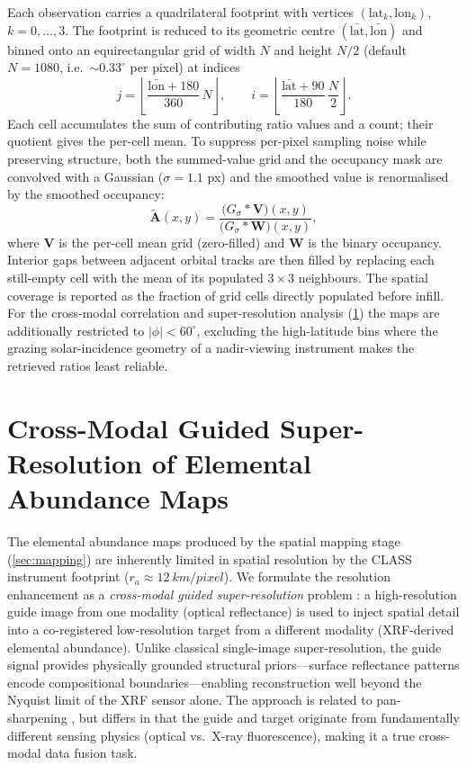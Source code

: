 \documentclass[journal,lettersize]{IEEEtran}
\begin{document}
Each observation carries a quadrilateral footprint with vertices
$(\mathrm{lat}_k, \mathrm{lon}_k)$, $k=0,\dots,3$. The footprint is
reduced to its geometric centre $(\bar{\mathrm{lat}}, \bar{\mathrm{lon}})$
and binned onto an equirectangular grid of width $N$ and height $N/2$
(default $N=1080$, i.e.\ $\sim0.33^{\circ}$ per pixel) at indices
\begin{equation}\label{eq:bin_index}
  j = \left\lfloor \frac{\bar{\mathrm{lon}}+180}{360}\,N \right\rfloor,
  \qquad
  i = \left\lfloor \frac{\bar{\mathrm{lat}}+90}{180}\,\frac{N}{2} \right\rfloor .
\end{equation}
Each cell accumulates the sum of contributing ratio values and a count;
their quotient gives the per-cell mean. To suppress per-pixel sampling
noise while preserving structure, both the summed-value grid and the
occupancy mask are convolved with a Gaussian ($\sigma=1.1$ px) and the
smoothed value is renormalised by the smoothed occupancy:
\begin{equation}\label{eq:smooth_renorm}
  \tilde{\mathbf{A}}(x,y) =
  \frac{\bigl(G_\sigma * \mathbf{V}\bigr)(x,y)}
       {\bigl(G_\sigma * \mathbf{W}\bigr)(x,y)},
\end{equation}
where $\mathbf{V}$ is the per-cell mean grid (zero-filled) and
$\mathbf{W}$ is the binary occupancy. Interior gaps between adjacent
orbital tracks are then filled by replacing each still-empty cell with the
mean of its populated $3\times3$ neighbours. The spatial coverage is
reported as the fraction of grid cells directly populated before infill.
For the cross-modal correlation and super-resolution analysis
(\cref{sec:superres}) the maps are additionally restricted to
$|\phi|<60^{\circ}$, excluding the high-latitude bins where the grazing
solar-incidence geometry of a nadir-viewing instrument makes the retrieved
ratios least reliable.



\section{Cross-Modal Guided Super-Resolution of Elemental Abundance Maps}%
\label{sec:superres}

The elemental abundance maps produced by the spatial mapping stage
(\cref{sec:mapping}) are inherently limited in spatial resolution by the
CLASS instrument footprint ($r_a \approx \SI{12}{km/pixel}$).  We
formulate the resolution enhancement as a \emph{cross-modal guided
super-resolution} problem \cite{Ham2018}: a high-resolution guide
image from one modality (optical reflectance) is used to inject spatial
detail into a co-registered low-resolution target from a different
modality (XRF-derived elemental abundance).  Unlike classical
single-image super-resolution, the guide signal provides physically
grounded structural priors---surface reflectance patterns encode
compositional boundaries---enabling reconstruction well beyond the
Nyquist limit of the XRF sensor alone.  The approach is related to
pan-sharpening \cite{Vivone2015}, but differs in that the guide and
target originate from fundamentally different sensing physics (optical
vs.\ X-ray fluorescence), making it a true cross-modal data fusion
task.
\end{document}
